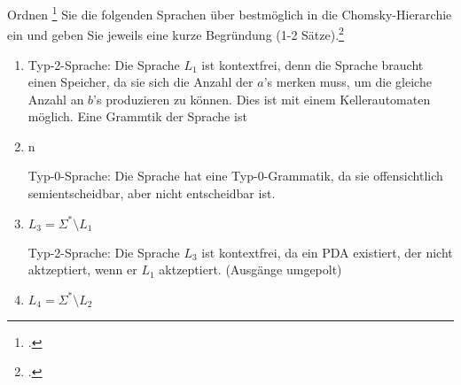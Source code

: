 \documentclass{bschlangaul-aufgabe}
\begin{document}

Ordnen \footcite{examen:66115:2016:09} Sie die
folgenden Sprachen über  bestmöglich in die
Chomsky-Hierarchie ein und geben Sie jeweils eine kurze Begründung (1-2
Sätze).\footcite[Aufgabe 8]{theo:ab:5}

\begin{enumerate}


\item {}

\begin{bAntwort}
Typ-2-Sprache: Die Sprache $L_1$ ist kontextfrei, denn die Sprache
braucht einen Speicher, da sie sich die Anzahl der $a$’s merken muss, um
die gleiche Anzahl an $b$’s produzieren zu können. Dies ist mit einem
Kellerautomaten möglich. Eine Grammtik der Sprache ist
\end{bAntwort}


\item {} { n }

\begin{bAntwort}
Typ-0-Sprache: Die Sprache hat eine Typ-0-Grammatik, da sie
offensichtlich semientscheidbar, aber nicht entscheidbar ist.
\end{bAntwort}


\item $L_3 = Σ^* \setminus L_1$

\begin{bAntwort}
Typ-2-Sprache: Die Sprache $L_3$ ist kontextfrei, da ein PDA existiert,
der nicht aktzeptiert, wenn er $L_1$ aktzeptiert. (Ausgänge umgepolt)
\end{bAntwort}


\item $L_4 = Σ^* \setminus L_2$


\end{enumerate}
\end{document}
